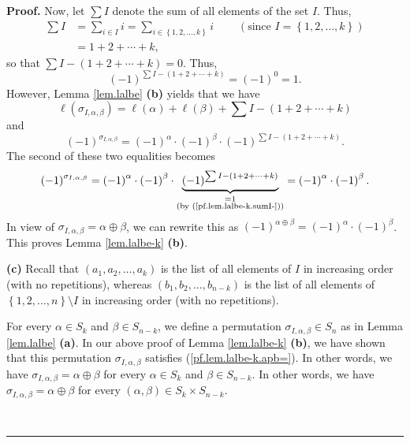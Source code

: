 \documentclass
[numbers=enddot,12pt,final,onecolumn,notitlepage,english]{scrartcl}%
\theoremstyle{definition}
\newenvironment{proof}[1][Proof]{\noindent\textbf{#1.} }{\ \rule{0.5em}{0.5em}}
\let\sumnonlimits\sum
\renewcommand{\sum}{\sumnonlimits\limits}
\newenvironment{verlong}{}{}
\begin{document}
\begin{verlong}
\begin{proof}
Now, let $\sum I$ denote the sum of all elements of the set $I$. Thus,
\begin{align*}
\sum I  &  =\sum_{i\in I}i=\sum_{i\in\left\{  1,2,\ldots,k\right\}
}i\ \ \ \ \ \ \ \ \ \ \left(  \text{since }I=\left\{  1,2,\ldots,k\right\}
\right) \\
&  =1+2+\cdots+k,
\end{align*}
so that $\sum I-\left(  1+2+\cdots+k\right)  =0$. Thus,
\begin{equation}
\left(  -1\right)  ^{\sum I-\left(  1+2+\cdots+k\right)  }=\left(  -1\right)
^{0}=1. \label{pf.lem.lalbe-k.sumI-}%
\end{equation}
However, Lemma \ref{lem.lalbe} \textbf{(b)} yields that we have
\[
\ell\left(  \sigma_{I,\alpha,\beta}\right)  =\ell\left(  \alpha\right)
+\ell\left(  \beta\right)  +\sum I-\left(  1+2+\cdots+k\right)
\]
and%
\[
\left(  -1\right)  ^{\sigma_{I,\alpha,\beta}}=\left(  -1\right)  ^{\alpha
}\cdot\left(  -1\right)  ^{\beta}\cdot\left(  -1\right)  ^{\sum I-\left(
1+2+\cdots+k\right)  }.
\]
The second of these two equalities becomes%
\[
\left(  -1\right)  ^{\sigma_{I,\alpha,\beta}}=\left(  -1\right)  ^{\alpha
}\cdot\left(  -1\right)  ^{\beta}\cdot\underbrace{\left(  -1\right)  ^{\sum
I-\left(  1+2+\cdots+k\right)  }}_{\substack{=1\\\text{(by
(\ref{pf.lem.lalbe-k.sumI-}))}}}=\left(  -1\right)  ^{\alpha}\cdot\left(
-1\right)  ^{\beta}.
\]
In view of $\sigma_{I,\alpha,\beta}=\alpha\oplus\beta$, we can rewrite this as
$\left(  -1\right)  ^{\alpha\oplus\beta}=\left(  -1\right)  ^{\alpha}%
\cdot\left(  -1\right)  ^{\beta}$. This proves Lemma \ref{lem.lalbe-k}
\textbf{(b)}. \medskip

\textbf{(c)} Recall that $\left(  a_{1},a_{2},\ldots,a_{k}\right)  $ is the
list of all elements of $I$ in increasing order (with no repetitions), whereas
$\left(  b_{1},b_{2},\ldots,b_{n-k}\right)  $ is the list of all elements of
$\left\{  1,2,\ldots,n\right\}  \setminus I$ in increasing order (with no repetitions).

For every $\alpha\in S_{k}$ and $\beta\in S_{n-k}$, we define a permutation
$\sigma_{I,\alpha,\beta}\in S_{n}$ as in Lemma \ref{lem.lalbe} \textbf{(a)}.
In our above proof of Lemma \ref{lem.lalbe-k} \textbf{(b)}, we have shown that
this permutation $\sigma_{I,\alpha,\beta}$ satisfies
(\ref{pf.lem.lalbe-k.apb=}). In other words, we have $\sigma_{I,\alpha,\beta
}=\alpha\oplus\beta$ for every $\alpha\in S_{k}$ and $\beta\in S_{n-k}$. In
other words, we have $\sigma_{I,\alpha,\beta}=\alpha\oplus\beta$ for every
$\left(  \alpha,\beta\right)  \in S_{k}\times S_{n-k}$.


\end{proof}
\end{verlong}
\end{document}
